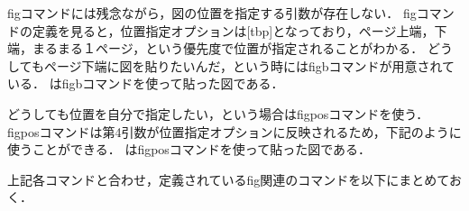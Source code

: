 figコマンドには残念ながら，図の位置を指定する引数が存在しない．
figコマンドの定義を見ると，位置指定オプションは[tbp]となっており，ページ上端，下端，まるまる１ページ，という優先度で位置が指定されることがわかる．
どうしてもページ下端に図を貼りたいんだ，という時にはfigbコマンドが用意されている．
はfigbコマンドを使って貼った図である．

どうしても位置を自分で指定したい，という場合はfigposコマンドを使う．
figposコマンドは第4引数が位置指定オプションに反映されるため，下記のように使うことができる．
はfigposコマンドを使って貼った図である．

上記各コマンドと合わせ，定義されているfig関連のコマンドを以下にまとめておく．
